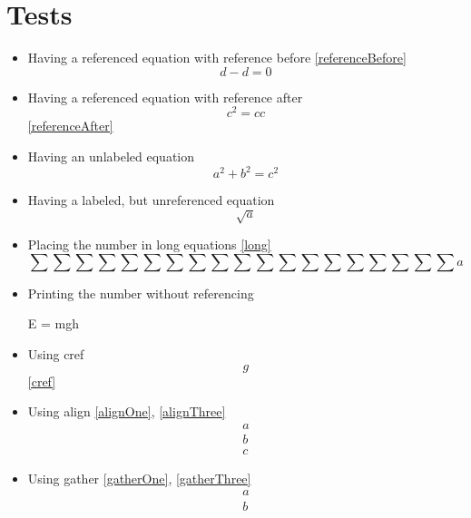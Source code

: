 \documentclass{article}
\begin{document}
	\section*{Tests}
	\begin{itemize}
		\item Having a referenced equation with reference before \ref{referenceBefore}
			\begin{equation}\label{referenceBefore}
				d - d = 0
			\end{equation}
		\item Having a referenced equation with reference after
			\begin{equation}\label{referenceAfter}
				c^2 = c c
			\end{equation}
			\ref{referenceAfter}
		\item Having an unlabeled equation
			\begin{equation}
				a^2 + b^2 = c^2
			\end{equation}
		\item Having a labeled, but unreferenced equation
			\begin{equation}\label{unreferenced}
				\sqrt{a}
			\end{equation}
		\item Placing the number in long equations \ref{long}
			\begin{equation}\label{long}
				\sum\sum\sum\sum\sum\sum\sum\sum\sum\sum\sum\sum\sum\sum\sum\sum\sum\sum\sum a
			\end{equation}
		\item Printing the number without referencing
			\begin{equation+}
				E = mgh
			\end{equation+}
		\item Using cref
			\begin{equation}\label{cref}
				g
			\end{equation}
			\cref{cref}
		\item Using align \ref{alignOne}, \ref{alignThree}
			\begin{align}
				a\label{alignOne}\\
				b\label{alignTwo}\\
				c\label{alignThree}
			\end{align}
		\item Using gather \ref{gatherOne}, \ref{gatherThree}
			\begin{gather}
				a\label{gatherOne}\\
				b\label{gatherTwo}\\

\end{gather}
\end{itemize}
\end{document}
